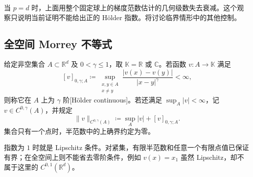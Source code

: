 当 \(p=d\) 时，上面用整个固定球上的梯度范数估计的几何级数失去衰减。这个观察只说明当前证明不能给出正的 Hölder 指数。将讨论临界情形中的其他控制。

\subsection{全空间 Morrey 不等式}
\label{b1:subsec:240302}

\begin{definition}\label{b1:def:holder-space}
给定非空集合 \(A\subset\mathbb R^d\) 及 \(0<\gamma\le1\)，取 \(\mathbb K=\mathbb R\) 或 \(\mathbb C\)。若函数 \(v:A\rightarrow\mathbb K\) 满足
\[
 [v]_{0,\gamma;A}
 \coloneqq\sup_{\substack{x,y\in A\\x\ne y}}
       \frac{|v(x)-v(y)|}{|x-y|^\gamma}<\infty,
\]
则称它在 \(A\) 上为 \(\gamma\) 阶[Hölder continuous]。若还满足 \(\sup_A|v|<\infty\)，记 \(v\in C^{0,\gamma}(A)\)，并规定
\[
 \|v\|_{C^{0,\gamma}(A)}
 \coloneqq\sup_A|v|+[v]_{0,\gamma;A}.
\]
集合只有一个点时，半范数中的上确界约定为零。
\end{definition}

指数为 \(1\) 时就是 Lipschitz 条件。对紧集，有限半范数和任意一个有限点值已保证有界；在全空间上则不能省去零阶条件，例如 \(v(x)=x_1\) 虽然 Lipschitz，却不属于这里的 \(C^{0,1}(\mathbb R^d)\)。

